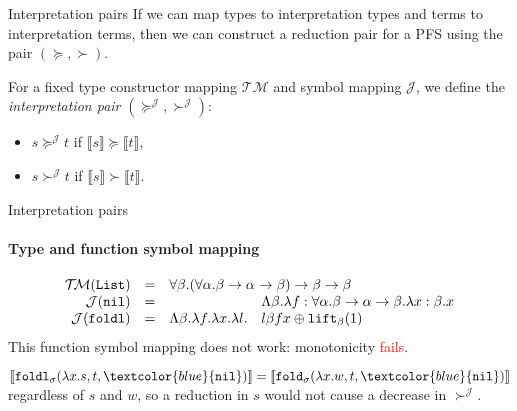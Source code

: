 \documentclass[10pt,presentation,color=names]{beamer}
\newcommand{\arrtype}{\rightarrow}
\newcommand{\quant}[2]{\forall #1.#2}
\newcommand{\abs}[2]{\lambda #1.#2}
\newcommand{\lift}{\mathtt{lift}}
\newcommand{\interpret}[1]{\llbracket #1 \rrbracket}
\newcommand{\Typemap}{\mathcal{T\!M}}
\newcommand{\Termmap}{\mathcal{J}}
\newcommand{\succinterpret}{\succ^{\Termmap}}
\newcommand{\succeqinterpret}{\succeq^{\Termmap}}
\newcommand{\symb}[1]{\textcolor{blue}{\mathtt{#1}}}
\newcommand{\List}{\mathtt{List}}
\newcommand{\nil}{\symb{nil}}
\begin{document}
\begin{frame}{Interpretation pairs}
  If we can map types to interpretation types and terms to
  interpretation terms, then we can construct a reduction pair for a
  PFS using the pair $(\succeq,\succ)$.
  \pause
  \begin{definition}
    For a fixed type constructor mapping $\Typemap$ and symbol mapping
    $\Termmap$, we define the \emph{interpretation pair}
    $(\succeqinterpret,\succinterpret)$:
    \begin{itemize}
    \item $s \succeqinterpret t$ if $\interpret{s} \succeq \interpret{t}$,
    \item $s \succinterpret t$ if $\interpret{s} \succ \interpret{t}$.
    \end{itemize}
  \end{definition}
\end{frame}

\begin{frame}{Interpretation pairs}
  \framesubtitle{Type and function symbol mapping}
  \[
  \begin{array}{rcll}
    \Typemap(\List) & = & \multicolumn{2}{l}{
      \quant{\beta}{(\quant{\alpha}{\beta \arrtype
      \alpha \arrtype \beta}) \arrtype \beta \arrtype \beta}}\\
  \Termmap(\mathtt{nil}) & = & & \Lambda \beta.\lambda f : \forall\alpha.\beta\to\alpha\to\beta.\abs{x:\beta}{x} \\
  \Termmap(\mathtt{foldl}) & = & \Lambda \beta.\lambda f. \lambda x.
  \lambda l. & l \beta f x \oplus \lift_\beta(1)
  \end{array}
  \]
  \pause
  This function symbol mapping does not work: monotonicity \textcolor{red}{fails}.\pause

  \medskip

  $\interpret{\mathtt{foldl}_{\sigma}(\abs{x}{s},t,\nil)} =
  \interpret{\mathtt{fold}_{\sigma}(\abs{x}{w},t,\nil)}$ regardless of
  $s$ and $w$, so a reduction in $s$ would not cause a decrease in
  $\succinterpret$.
\end{frame}
\end{document}
